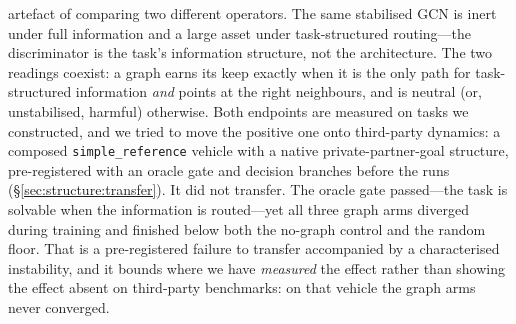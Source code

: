 artefact of comparing two different operators. The same stabilised GCN is
inert under full information and a large asset under task-structured
routing---the discriminator is the task's information structure, not the
architecture. The two readings coexist: a graph earns its keep
exactly when it is the only path for task-structured information \emph{and}
points at the right neighbours, and is neutral (or, unstabilised, harmful)
otherwise. Both endpoints are measured on tasks we constructed, and we tried to
move the positive one onto third-party dynamics: a composed
\texttt{simple\_reference} vehicle with a native private-partner-goal
structure, pre-registered with an oracle gate and decision branches before the
runs (\S\ref{sec:structure:transfer}). It did not transfer. The oracle gate
passed---the task is solvable when the information is routed---yet all three
graph arms diverged during training and finished below both the no-graph
control and the random floor. That is a pre-registered failure to transfer
accompanied by a characterised instability, and it bounds where we have
\emph{measured} the effect rather than showing the effect absent on third-party
benchmarks: on that vehicle the graph arms never converged.

